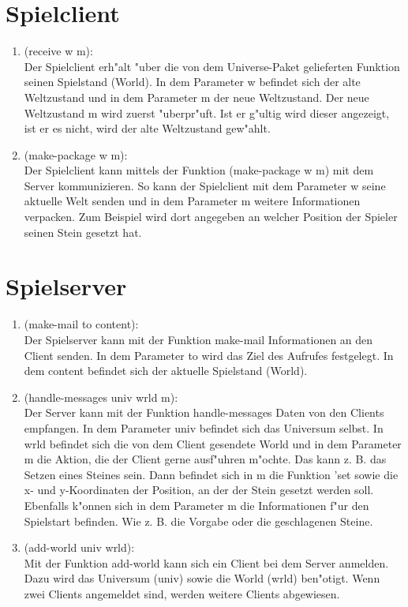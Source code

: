 \documentclass[a4paper]{scrreprt}
\begin{document}
\section{Spielclient}


\begin{enumerate}
\item (receive w m):\\
Der Spielclient erh"alt "uber die von dem Universe-Paket gelieferten Funktion seinen Spielstand (World). In dem Parameter w befindet sich der alte Weltzustand und in dem Parameter m der neue Weltzustand. Der neue Weltzustand m wird zuerst "uberpr"uft. Ist er g"ultig wird dieser angezeigt, ist er es nicht, wird der alte Weltzustand gew"ahlt.

\item (make-package w m):\\
Der Spielclient kann mittels der Funktion (make-package w m) mit dem Server kommunizieren. So kann der Spielclient mit dem Parameter w seine aktuelle Welt senden und in dem Parameter m weitere Informationen verpacken. Zum Beispiel wird dort angegeben an welcher Position der Spieler seinen Stein gesetzt hat.

\end{enumerate}

\section{Spielserver}
\begin{enumerate}
\item (make-mail to content):\\
Der Spielserver kann mit der Funktion make-mail Informationen an den Client senden. In dem Parameter to wird das Ziel des Aufrufes festgelegt. In dem content befindet sich der aktuelle Spielstand (World).

\item (handle-messages univ wrld m):\\
Der Server kann mit der Funktion handle-messages Daten von den Clients empfangen. In dem Parameter univ befindet sich das Universum selbst. In wrld befindet sich die von dem Client gesendete World und in dem Parameter m die Aktion, die der Client gerne ausf"uhren m"ochte. Das kann z. B. das Setzen eines Steines sein. Dann befindet sich in m die Funktion 'set sowie die x- und y-Koordinaten der Position, an der der Stein gesetzt werden soll. Ebenfalls k"onnen sich in dem Parameter m die Informationen f"ur den Spielstart befinden. Wie z. B. die Vorgabe oder die geschlagenen Steine. 

\item (add-world univ wrld):\\
Mit der Funktion add-world kann sich ein Client bei dem Server anmelden. Dazu wird das Universum (univ) sowie die World (wrld) ben"otigt. Wenn zwei Clients angemeldet sind, werden weitere Clients abgewiesen.
\end{enumerate}
\end{document}
